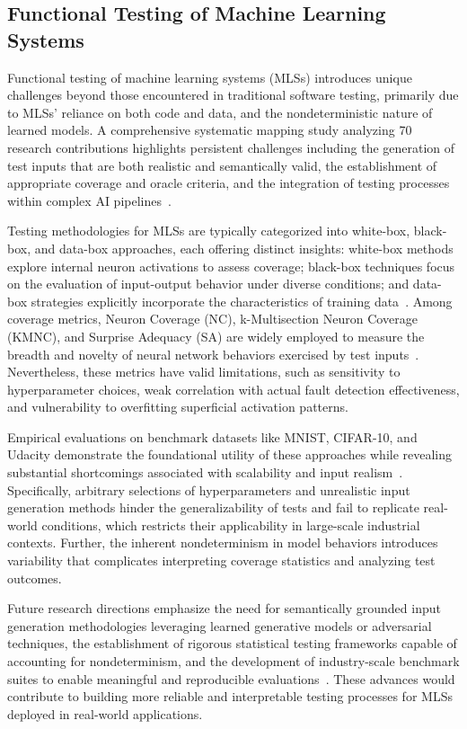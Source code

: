 \documentclass[sigconf]{acmart}
\begin{document}
\subsection{Functional Testing of Machine Learning Systems}

Functional testing of machine learning systems (MLSs) introduces unique challenges beyond those encountered in traditional software testing, primarily due to MLSs’ reliance on both code and data, and the nondeterministic nature of learned models. A comprehensive systematic mapping study analyzing 70 research contributions highlights persistent challenges including the generation of test inputs that are both realistic and semantically valid, the establishment of appropriate coverage and oracle criteria, and the integration of testing processes within complex AI pipelines~\cite{ref27}.

Testing methodologies for MLSs are typically categorized into white-box, black-box, and data-box approaches, each offering distinct insights: white-box methods explore internal neuron activations to assess coverage; black-box techniques focus on the evaluation of input-output behavior under diverse conditions; and data-box strategies explicitly incorporate the characteristics of training data~\cite{ref27}. Among coverage metrics, Neuron Coverage (NC), k-Multisection Neuron Coverage (KMNC), and Surprise Adequacy (SA) are widely employed to measure the breadth and novelty of neural network behaviors exercised by test inputs~\cite{ref3}. Nevertheless, these metrics have valid limitations, such as sensitivity to hyperparameter choices, weak correlation with actual fault detection effectiveness, and vulnerability to overfitting superficial activation patterns.

Empirical evaluations on benchmark datasets like MNIST, CIFAR-10, and Udacity demonstrate the foundational utility of these approaches while revealing substantial shortcomings associated with scalability and input realism~\cite{ref27}. Specifically, arbitrary selections of hyperparameters and unrealistic input generation methods hinder the generalizability of tests and fail to replicate real-world conditions, which restricts their applicability in large-scale industrial contexts. Further, the inherent nondeterminism in model behaviors introduces variability that complicates interpreting coverage statistics and analyzing test outcomes.

Future research directions emphasize the need for semantically grounded input generation methodologies leveraging learned generative models or adversarial techniques, the establishment of rigorous statistical testing frameworks capable of accounting for nondeterminism, and the development of industry-scale benchmark suites to enable meaningful and reproducible evaluations~\cite{ref27}. These advances would contribute to building more reliable and interpretable testing processes for MLSs deployed in real-world applications.
\end{document}
